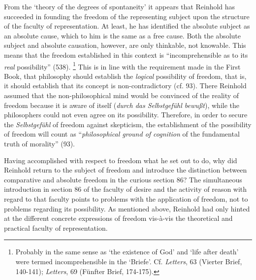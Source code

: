  From the `theory of the degrees of spontaneity' it appears that Reinhold has succeeded in founding the freedom of the representing subject upon the structure of the faculty of representation. At least, he has identified the absolute subject as an absolute cause, which to him is the same as a free cause. Both the absolute subject and absolute causation, however, are only thinkable, not knowable. This means that the freedom established in this context is ``incomprehensible as to its \textit{real} possibility'' (538). \footnote{ Probably in the same sense as `the existence of God' and `life after death' were termed incomprehensible in the `Briefe'. Cf. \textit{Letters}, 63 (Vierter Brief, 140{-}141); \textit{Letters}, 69 (F\"{u}nfter Brief, 174{-}175). } This is in line with the requirement made in the First Book, that philosophy should establish the \textit{logical} possibility of freedom, that is, it should establish that its concept is non{-}contradictory (cf. 93). There Reinhold assumed that the non{-}philosophical mind would be convinced of the reality of freedom because it is aware of itself (\textit{durch das Selbstgef\"{u}hl bewu\ss{}t}), while the philosophers could not even agree on its possibility. Therefore, in order to secure the \textit{Selbstgef\"{u}hl }of freedom against skepticism, the establishment of the possibility of freedom will count as ``\textit{philosophical ground of cognition} of the fundamental truth of morality'' (93). 

 Having accomplished with respect to freedom what he set out to do, why did Reinhold return to the subject of freedom and introduce the distinction between comparative and absolute freedom in the curious section 86? The simultaneous introduction in section 86 of the faculty of desire and the activity of reason with regard to that faculty points to problems with the application of freedom, not to problems regarding its possibility. As mentioned above, Reinhold had only hinted at the different concrete expressions of freedom vis{-}\`{a}{-}vis the theoretical and practical faculty of representation. 

